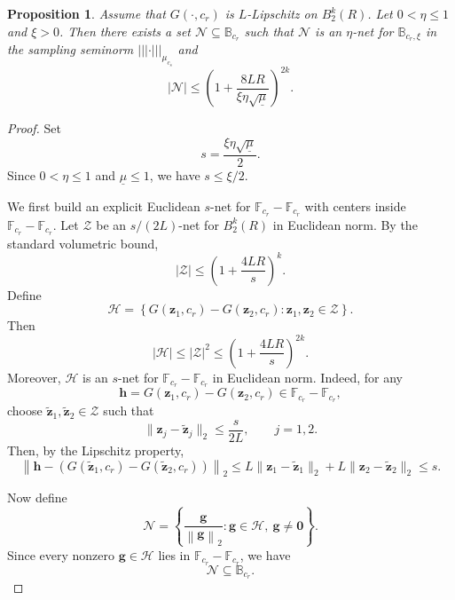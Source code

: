 \documentclass[10pt,a4paper]{amsart}
\newtheorem{proposition}{Proposition}
\newcommand*{\snorm}[2]{\left\vert\!\left\vert\!\left\vert #1 \right\vert\!\right\vert\!\right\vert_{#2}}
\begin{document}
\begin{proposition}
  \label{prop:lipschitz-cover-transfer}
  Assume that $G(\cdot,c_r)$ is $L$-Lipschitz on $B_2^k(R)$. Let $0<\eta\leq 1$ and $\xi>0$. Then
  there exists a set $\mathcal N\subseteq\mathbb B_{c_r}$ such that
  $\mathcal N$ is an $\eta$-net for $\mathbb B_{c_r,\xi}$ in the sampling
  seminorm $\snorm{\cdot}{\mu_{c_s}}$ and
  \[
    |\mathcal N|
    \leq
    \left(
      1+
      \frac{8LR}
      {\xi\eta\sqrt{\underline{\mu}}}
    \right)^{2k}.
  \]
\end{proposition}

\begin{proof}
  Set
  \[
    s=\frac{\xi\eta\sqrt{\underline{\mu}}}{2}.
  \]
  Since $0<\eta\leq 1$ and $\underline{\mu}\leq 1$, we have
  $s\leq \xi/2$.

  We first build an explicit Euclidean $s$-net for
  $\mathbb F_{c_r}-\mathbb F_{c_r}$ with centers inside
  $\mathbb F_{c_r}-\mathbb F_{c_r}$. Let $\mathcal Z$ be an
  $s/(2L)$-net for $B_2^k(R)$ in Euclidean norm. By the standard
  volumetric bound,
  \[
    |\mathcal Z|
    \leq
    \left(
      1+
      \frac{4LR}{s}
    \right)^k.
  \]
  Define
  \[
    \mathcal H
    =
    \left\{
      G(\mathbf z_1,c_r)-G(\mathbf z_2,c_r)
      :
      \mathbf z_1,\mathbf z_2\in\mathcal Z
    \right\}.
  \]
  Then
  \[
    |\mathcal H|
    \leq
    |\mathcal Z|^2
    \leq
    \left(
      1+
      \frac{4LR}{s}
    \right)^{2k}.
  \]
  Moreover, $\mathcal H$ is an $s$-net for
  $\mathbb F_{c_r}-\mathbb F_{c_r}$ in Euclidean norm. Indeed, for any
  \[
    \mathbf h
    =
    G(\mathbf z_1,c_r)-G(\mathbf z_2,c_r)
    \in
    \mathbb F_{c_r}-\mathbb F_{c_r},
  \]
  choose $\tilde{\mathbf z}_1,\tilde{\mathbf z}_2\in\mathcal Z$ such that
  \[
    \|\mathbf z_j-\tilde{\mathbf z}_j\|_2
    \leq
    \frac{s}{2L},
    \qquad
    j=1,2.
  \]
  Then, by the Lipschitz property,
  \[
    \left\|
      \mathbf h
      -
      \left(
        G(\tilde{\mathbf z}_1,c_r)
        -
        G(\tilde{\mathbf z}_2,c_r)
      \right)
    \right\|_2
    \leq
    L\|\mathbf z_1-\tilde{\mathbf z}_1\|_2
    +
    L\|\mathbf z_2-\tilde{\mathbf z}_2\|_2
    \leq
    s.
  \]

  Now define
  \[
    \mathcal N
    =
    \left\{
      \frac{\mathbf g}{\left\|\mathbf g\right\|_2}
      :
      \mathbf g\in\mathcal H,\ \mathbf g\neq \mathbf 0
    \right\}.
  \]
  Since every nonzero $\mathbf g\in\mathcal H$ lies in
  $\mathbb F_{c_r}-\mathbb F_{c_r}$, we have
  \[
    \mathcal N\subseteq\mathbb B_{c_r}.
  \]


\end{proof}
\end{document}
